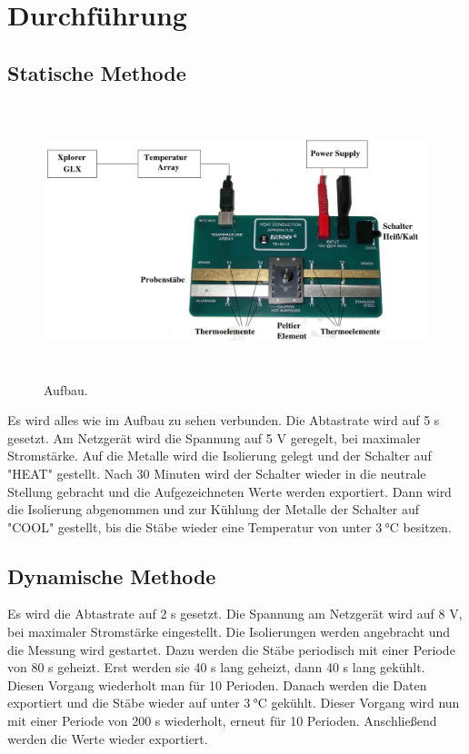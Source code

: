 \section{Durchführung}
\subsection{Statische Methode}
\label{sec:Durchführung}
\begin{figure}
  \centering
  \includegraphics[height=8cm]{data/abb1.jpg}
  \caption{Aufbau. \cite{V204}}
  \label{fig:Abb1}
\end{figure}
Es wird alles wie im Aufbau zu sehen verbunden.
Die Abtastrate wird auf 5 s gesetzt.
Am Netzgerät wird die Spannung auf 5 V geregelt, bei maximaler Stromstärke.
Auf die Metalle wird die Isolierung gelegt und der Schalter auf "HEAT" gestellt.
Nach 30 Minuten wird der Schalter wieder in die neutrale Stellung gebracht und die Aufgezeichneten Werte werden exportiert.
Dann wird die Isolierung abgenommen und zur Kühlung der Metalle der Schalter auf "COOL" gestellt, bis die Stäbe wieder eine Temperatur von unter $\SI{3}{\celsius}$ besitzen.

\subsection{Dynamische Methode}
Es wird die Abtastrate auf 2 s gesetzt.
Die Spannung am Netzgerät wird auf 8 V, bei maximaler Stromstärke eingestellt.
Die Isolierungen werden angebracht und die Messung wird gestartet.
Dazu werden die Stäbe periodisch mit einer Periode von 80 s geheizt.
Erst werden sie 40 s lang geheizt, dann 40 s lang gekühlt.
Diesen Vorgang wiederholt man für 10 Perioden.
Danach werden die Daten exportiert und die Stäbe wieder auf unter $\SI{3}{\celsius}$ gekühlt.
Dieser Vorgang wird nun mit einer Periode von 200 s wiederholt, erneut für 10 Perioden.
Anschließend werden die Werte wieder exportiert.
